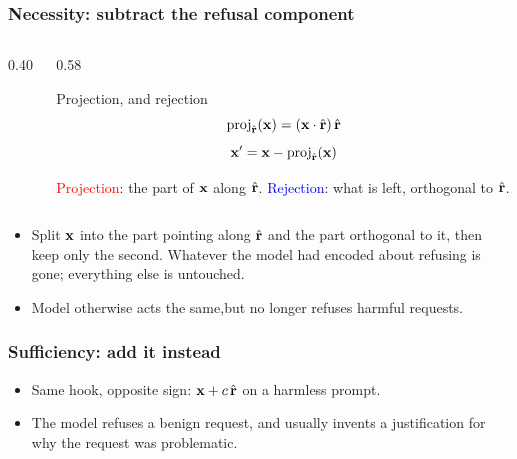 \begin{frame}
\frametitle{Necessity: subtract the refusal component}
\begin{columns}[c]
\begin{column}{0.40\textwidth}
\begin{center}
\end{center}
\end{column}
\begin{column}{0.58\textwidth}
\begin{block}{Projection, and rejection}
$$
\operatorname{proj}_{\hat{\mathbf{r}}}\!\left(\mathbf{x}\right) = \left(\mathbf{x} \cdot \hat{\mathbf{r}}\right)\hat{\mathbf{r}}
$$
$$
\mathbf{x}' = \mathbf{x} - \operatorname{proj}_{\hat{\mathbf{r}}}\!\left(\mathbf{x}\right)
$$
\end{block}
\textcolor{red}{Projection}: the part of $\mathbf{x}$ along $\hat{\mathbf{r}}$.
\textcolor{blue}{Rejection}: what is left, orthogonal to $\hat{\mathbf{r}}$.
\end{column}
\end{columns}
\vspace{0.1cm}
\begin{itemize}
    \item Split $\mathbf{x}$ into the part pointing along $\hat{\mathbf{r}}$ and the part
    orthogonal to it, then keep only the second. Whatever the model had encoded
    about refusing is gone; everything else is untouched.
    \item Model otherwise acts the same,but no longer refuses harmful requests.
\end{itemize}
\end{frame}

\begin{frame}
\frametitle{Sufficiency: add it instead}
\begin{itemize}
    \item Same hook, opposite sign: $\mathbf{x} + c\,\hat{\mathbf{r}}$ on a harmless prompt.
    \item The model refuses a benign request, and usually invents a
    justification for why the request was problematic.
\end{itemize}
\end{frame}

